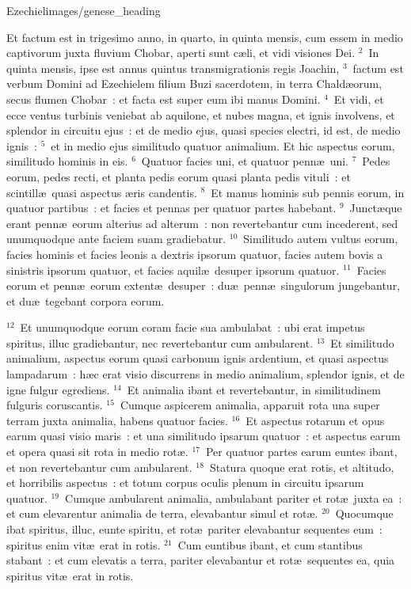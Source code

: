 {Ezechiel}{images/genese_heading}


\bchapter
\lettrine[lines=6,image=true,loversize=0.05,lraise=-0.03]{E}{}t factum est in trigesimo anno, in quarto, in quinta mensis, cum essem in medio captivorum juxta fluvium Chobar, aperti sunt c\ae li, et vidi visiones Dei.
${}^{2}$~In quinta mensis, ipse est annus quintus transmigrationis regis Joachin,
${}^{3}$~factum est verbum Domini ad Ezechielem filium Buzi sacerdotem, in terra Chald\ae orum, secus flumen Chobar~: et facta est super eum ibi manus Domini.
${}^{4}$~Et vidi, et ecce ventus turbinis veniebat ab aquilone, et nubes magna, et ignis involvens, et splendor in circuitu ejus~: et de medio ejus, quasi species electri, id est, de medio ignis~:
${}^{5}$~et in medio ejus similitudo quatuor animalium. Et hic aspectus eorum, similitudo hominis in eis.
${}^{6}$~Quatuor facies uni, et quatuor penn\ae\ uni.
${}^{7}$~Pedes eorum, pedes recti, et planta pedis eorum quasi planta pedis vituli~: et scintill\ae\ quasi aspectus \ae ris candentis.
${}^{8}$~Et manus hominis sub pennis eorum, in quatuor partibus~: et facies et pennas per quatuor partes habebant.
${}^{9}$~Junct\ae que erant penn\ae\ eorum alterius ad alterum~: non revertebantur cum incederent, sed unumquodque ante faciem suam gradiebatur.
${}^{10}$~Similitudo autem vultus eorum, facies hominis et facies leonis a dextris ipsorum quatuor, facies autem bovis a sinistris ipsorum quatuor, et facies aquil\ae\ desuper ipsorum quatuor.
${}^{11}$~Facies eorum et penn\ae\ eorum extent\ae\ desuper~: du\ae\ penn\ae\ singulorum jungebantur, et du\ae\ tegebant corpora eorum.


${}^{12}$~Et unumquodque eorum coram facie sua ambulabat~: ubi erat impetus spiritus, illuc gradiebantur, nec revertebantur cum ambularent.
${}^{13}$~Et similitudo animalium, aspectus eorum quasi carbonum ignis ardentium, et quasi aspectus lampadarum~: h\ae c erat visio discurrens in medio animalium, splendor ignis, et de igne fulgur egrediens.
${}^{14}$~Et animalia ibant et revertebantur, in similitudinem fulguris coruscantis.
${}^{15}$~Cumque aspicerem animalia, apparuit rota una super terram juxta animalia, habens quatuor facies.
${}^{16}$~Et aspectus rotarum et opus earum quasi visio maris~: et una similitudo ipsarum quatuor~: et aspectus earum et opera quasi sit rota in medio rot\ae .
${}^{17}$~Per quatuor partes earum euntes ibant, et non revertebantur cum ambularent.
${}^{18}$~Statura quoque erat rotis, et altitudo, et horribilis aspectus~: et totum corpus oculis plenum in circuitu ipsarum quatuor.
${}^{19}$~Cumque ambularent animalia, ambulabant pariter et rot\ae\ juxta ea~: et cum elevarentur animalia de terra, elevabantur simul et rot\ae .
${}^{20}$~Quocumque ibat spiritus, illuc, eunte spiritu, et rot\ae\ pariter elevabantur sequentes eum~: spiritus enim vit\ae\ erat in rotis.
${}^{21}$~Cum euntibus ibant, et cum stantibus stabant~: et cum elevatis a terra, pariter elevabantur et rot\ae\ sequentes ea, quia spiritus vit\ae\ erat in rotis.


